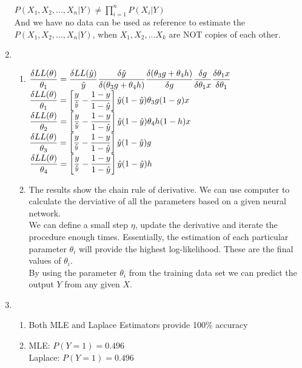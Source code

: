 \documentclass{article}
\begin{document}
\begin{enumerate}
	$P(X_1, X_2,...,X_n|Y)\neq \prod\limits_{i = 1}^{n}P(X_i|Y)$\\
	And we have no data can be used as reference to estimate the $P(X_1, X_2,...,X_n|Y)$, when $X_1, X_2,...X_k$ are NOT copies of each other.
	\item
	\begin{enumerate}
		\item
		$\mathlarger{\frac{\delta LL(\theta)}{\theta_1}
			=\frac{\delta LL(\hat{y})}{\hat{y}}
			 \frac{\delta \hat{y}}{\delta(\theta_3 g + \theta_4 h)}
			 \frac{\delta(\theta_3 g + \theta_4 h)}{\delta g}
			 \frac{\delta g}{\delta\theta_1 x}
			 \frac{\delta \theta_1 x}{\delta \theta_1}
		 }$\\
	 	$\mathlarger{\frac{\delta LL(\theta)}{\theta_1}
	 		=\left[\frac{y}{\hat{^y}}-\frac{1-y}{1-\hat{y}}\right]
	 		\hat{y}(1-\hat{y})
	 		\theta_3
	 		g(1-g)
	 		x
 		}$\\
	 	$\mathlarger{\frac{\delta LL(\theta)}{\theta_2}
			=\left[\frac{y}{\hat{^y}}-\frac{1-y}{1-\hat{y}}\right]
			\hat{y}(1-\hat{y})
			\theta_4
			h(1-h)
			x
		}$\\ 	
	 	$\mathlarger{\frac{\delta LL(\theta)}{\theta_3}
			=\left[\frac{y}{\hat{^y}}-\frac{1-y}{1-\hat{y}}\right]
			\hat{y}(1-\hat{y})
			g
		}$\\
		$\mathlarger{\frac{\delta LL(\theta)}{\theta_4}
			=\left[\frac{y}{\hat{^y}}-\frac{1-y}{1-\hat{y}}\right]
			\hat{y}(1-\hat{y})
			h
		}$\\ 
		\item
		The results show the chain rule of derivative. We can use computer to calculate the derviative of all the parameters based on a given neural network.\\
		We can define a small step $\eta$, update the derivative and iterate the procedure enough times. Essentially, the estimation of each particular parameter $\theta_i$ will provide the highest log-likelihood. These are the final values of $\theta_i$.\\
		By using the parameter $\theta_i$ from the training data set we can predict the output $Y$ from any given $X$.
	\end{enumerate}
	\item
	\begin{enumerate}
		\item
		Both MLE and Laplace Estimators provide 100\% accuracy
		\item
		MLE: $P(Y = 1) = 0.496$\\
		Laplace: $P(Y = 1) = 0.496$\\


\end{enumerate}
\end{enumerate}
\end{document}
